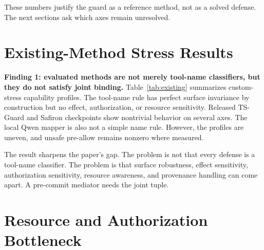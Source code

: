 \documentclass[10pt,twocolumn]{article}
\begin{document}
These numbers justify the guard as a reference method, not as a solved defense. The next sections ask which axes remain unresolved.

\section{Existing-Method Stress Results}

\textbf{Finding 1: evaluated methods are not merely tool-name classifiers, but they do not satisfy joint binding.} Table~\ref{tab:existing} summarizes custom-stress capability profiles. The tool-name rule has perfect surface invariance by construction but no effect, authorization, or resource sensitivity. Released TS-Guard and Safiron checkpoints show nontrivial behavior on several axes. The local Qwen mapper is also not a simple name rule. However, the profiles are uneven, and unsafe pre-allow remains nonzero where measured.

\begin{table}[t]
\centering
\small
\caption{Existing-method and component profiles under our custom stress. These rows are not original-paper benchmark reproductions. N/I means that the component does not make the realized-effect decision needed for the metric.}
\label{tab:existing}
\end{table}

The result sharpens the paper's gap. The problem is not that every defense is a tool-name classifier. The problem is that surface robustness, effect sensitivity, authorization sensitivity, resource awareness, and provenance handling can come apart. A pre-commit mediator needs the joint tuple.

\section{Resource and Authorization Bottleneck}
\end{document}
